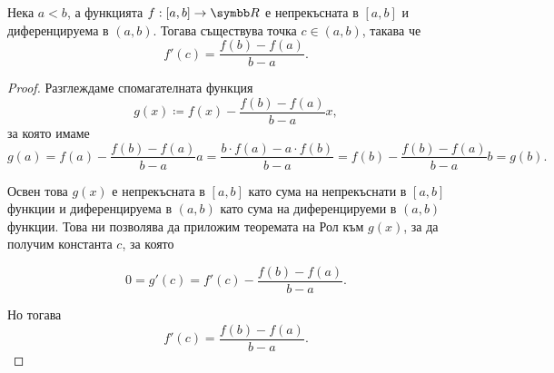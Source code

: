 \documentclass[
  headings=standardclasses,
  bibliography=totocnumbered,
]{scrartcl}
\begin{document}
\begin{theorem}
  Нека \( a < b \), а функцията \( f: [a, b] \to \R \) е непрекъсната в \( [a, b] \) и диференцируема в \( (a, b) \). Тогава съществува точка \( c \in (a, b) \), такава че
  \begin{equation*}
    f'(c) = \frac {f(b) - f(a)} {b-a}.
  \end{equation*}
\end{theorem}
\begin{proof}
  Разглеждаме спомагателната функция
  \begin{equation*}
    g(x) \coloneqq f(x) - \frac {f(b) - f(a)} {b-a} x,
  \end{equation*}
  за която имаме
  \begin{equation*}
    g(a)
    =
    f(a) - \frac {f(b) - f(a)} {b-a} a
    =
    \frac {b \cdot f(a) - a \cdot f(b)} {b-a}
    =
    f(b) - \frac {f(b) - f(a)} {b-a} b
    =
    g(b).
  \end{equation*}

  Освен това \( g(x) \) е непрекъсната в \( [a, b] \) като сума на непрекъснати в \( [a, b] \) функции и диференцируема в \( (a, b) \) като сума на диференцируеми в \( (a, b) \) функции. Това ни позволява да приложим теоремата на Рол към \( g(x) \), за да получим константа \( c \), за която

  \begin{equation*}
    0 = g'(c) = f'(c) - \frac {f(b) - f(a)} {b-a}.
  \end{equation*}

  Но тогава
  \begin{equation*}
    f'(c) = \frac {f(b) - f(a)} {b-a}.
  \end{equation*}
\end{proof}
\end{document}
